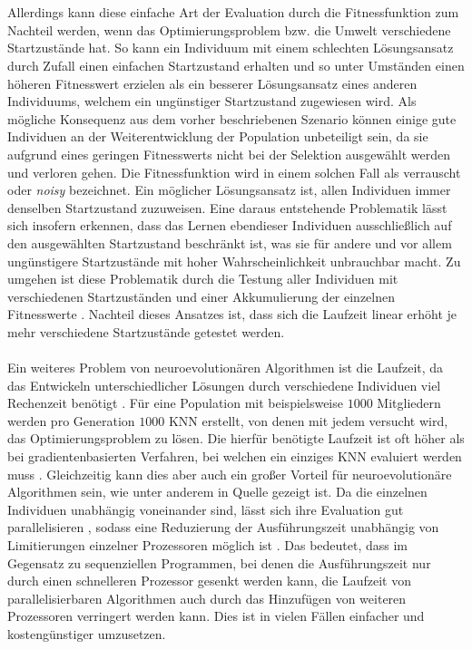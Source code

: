 \\\\
Allerdings kann diese einfache Art der Evaluation durch die Fitnessfunktion zum Nachteil werden, wenn das Optimierungsproblem bzw. die Umwelt verschiedene Startzustände hat. So kann ein Individuum mit einem schlechten Lösungsansatz durch Zufall einen einfachen Startzustand erhalten und so unter Umständen einen höheren Fitnesswert erzielen als ein besserer Lösungsansatz eines anderen Individuums, welchem ein ungünstiger Startzustand zugewiesen wird. Als mögliche Konsequenz aus dem vorher beschriebenen Szenario können einige gute Individuen an der Weiterentwicklung der Population unbeteiligt sein, da sie aufgrund eines geringen Fitnesswerts nicht bei der Selektion ausgewählt werden und verloren gehen. Die Fitnessfunktion wird in einem solchen Fall als verrauscht oder \emph{noisy} bezeichnet. Ein möglicher Lösungsansatz ist, allen Individuen immer denselben Startzustand zuzuweisen. Eine daraus entstehende Problematik lässt sich insofern erkennen, dass das Lernen ebendieser Individuen ausschließlich auf den ausgewählten Startzustand beschränkt ist, was sie für andere und vor allem ungünstigere Startzustände mit hoher Wahrscheinlichkeit unbrauchbar macht. Zu umgehen ist diese Problematik durch die Testung aller Individuen mit verschiedenen Startzuständen und einer 
Akkumulierung der einzelnen Fitnesswerte \cite{whitley1993genetic}. Nachteil dieses Ansatzes ist, dass sich die Laufzeit linear erhöht je mehr verschiedene Startzustände getestet werden.
\\\\
Ein weiteres Problem von neuroevolutionären Algorithmen ist die Laufzeit, da das Entwickeln unterschiedlicher Lösungen durch verschiedene Individuen viel Rechenzeit benötigt \cite{rojas1996neural}. Für eine Population mit beispielsweise $1000$ Mitgliedern werden pro Generation $1000$ \ac{KNN} erstellt, von denen mit jedem versucht wird, das Optimierungsproblem zu lösen. Die hierfür benötigte Laufzeit ist oft höher als bei gradientenbasierten Verfahren, bei welchen ein einziges \ac{KNN} evaluiert werden muss \cite{whitley1993genetic}. Gleichzeitig kann dies aber auch ein großer Vorteil für neuroevolutionäre Algorithmen sein, wie unter anderem in Quelle \cite{such2017deep} gezeigt ist. Da die einzelnen Individuen unabhängig voneinander sind, lässt sich ihre Evaluation gut parallelisieren \cite{rojas1996neural}, sodass eine Reduzierung der Ausführungszeit unabhängig von Limitierungen einzelner Prozessoren möglich ist \cite{schleuter1991explicit}. Das bedeutet, dass im Gegensatz zu sequenziellen Programmen, bei denen die Ausführungszeit nur durch einen schnelleren Prozessor gesenkt werden kann, die Laufzeit von parallelisierbaren Algorithmen auch durch das Hinzufügen von weiteren Prozessoren verringert werden kann. Dies ist in vielen Fällen einfacher und kostengünstiger umzusetzen.

